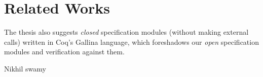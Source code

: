 \section{Related Works}
\label{sec:program:related}

The thesis
also suggests \emph{closed} specification modules (\ie without making
external calls) written in Coq's Gallina language, which foreshadows
our \emph{open} specification modules and verification against them.

\myparagraph{\certikos}




Nikhil swamy
